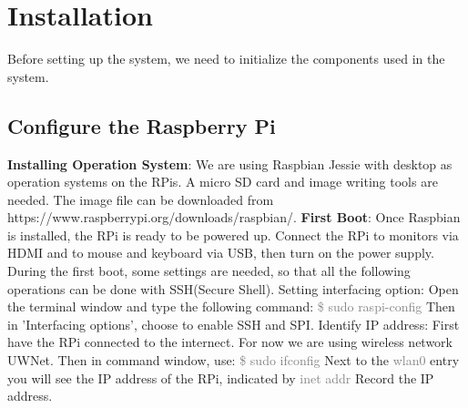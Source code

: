 \documentclass{article}
\begin{document}
\section{Installation}
Before setting up the system, we need to initialize the components used in the system.
\subsection{Configure the Raspberry Pi}
\textbf{Installing Operation System}: We are using Raspbian Jessie with desktop as operation systems on the RPis. A micro SD card and image writing tools are needed. The image file can be downloaded from https://www.raspberrypi.org/downloads/raspbian/. \newline\newline
\textbf{First Boot}: Once Raspbian is installed, the RPi is ready to be powered up. Connect the RPi to monitors via HDMI and to mouse and keyboard via USB, then turn on the power supply. \newline
During the first boot, some settings are needed, so that all the following operations can be done with SSH(Secure Shell).\newline\newline
Setting interfacing option: \newline Open the terminal window and type the following command: \newline
\textcolor{gray}{\$ sudo raspi-config} \newline
Then in 'Interfacing options', choose to enable SSH and SPI. \newline\newline
Identify IP address: \newline First have the RPi connected to the internect. For now we are using wireless network UWNet. Then in command window, use:\newline
\textcolor{gray}{\$ sudo ifconfig} \newline Next to the \textcolor{gray}{wlan0} entry you will see the IP address of the RPi, indicated by \textcolor{gray}{inet addr} \newline
Record the IP address.\newline\newline
\end{document}
